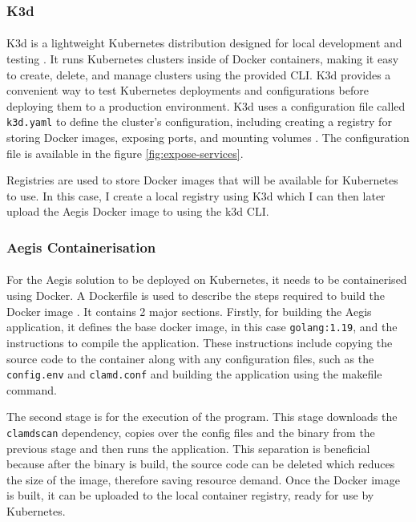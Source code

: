 \documentclass[12pt, conference, final, a4paper, onecolumn, compsoc]{IEEEtran}
\begin{document}
\subsubsection*{K3d}
\paragraph{}
K3d is a lightweight Kubernetes distribution designed for local
development and testing \citep{k3d}. It runs Kubernetes clusters inside of Docker
containers, making it easy to create, delete, and manage clusters using the
provided CLI. K3d provides a convenient way to test Kubernetes deployments and
configurations before deploying them to a production environment. K3d uses a
configuration file called \texttt{k3d.yaml} to define the cluster's
configuration, including creating a registry for storing Docker images, exposing
ports, and mounting volumes \citep{k3d-conf}. The configuration file is
available in the figure \ref{fig:expose-services}.

Registries are used to store Docker images that will be available for Kubernetes
to use. In this case, I create a local registry using K3d which I can then later
upload the Aegis Docker image to using the k3d CLI.

\subsubsection*{Aegis Containerisation}
\paragraph{}
For the Aegis solution to be deployed on Kubernetes, it needs to be
containerised using Docker. A Dockerfile is used to describe the steps required
to build the Docker image \citep{dockerfile} \citep{dockerfile-micro}. It contains 2 major sections.
Firstly, for building the Aegis application, it defines the base docker image, in this
case \texttt{golang:1.19}, and the instructions to compile the application. These
instructions include copying the source code to the container along with any
configuration files, such as the \texttt{config.env} and \texttt{clamd.conf} and
building the application using the makefile command.

The second stage is for the execution of the program. This stage downloads the
\texttt{clamdscan} dependency, copies over the config files and the binary from
the previous stage and then runs the application. This separation is beneficial
because after the binary is build, the source code can be deleted which reduces
the size of the image, therefore saving resource demand. Once the Docker image
is built, it can be uploaded to the local container registry, ready for use by
Kubernetes.
\end{document}
